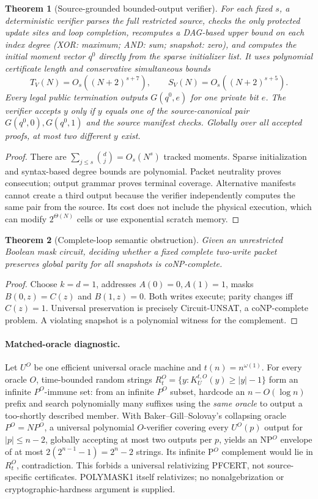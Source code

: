 \documentclass{article}
\newtheorem{theorem}{Theorem}
\begin{document}
\begin{theorem}[Source-grounded bounded-output verifier]
For each fixed $s$, a deterministic verifier parses the full restricted source, checks the only protected update sites and loop completion, recomputes a DAG-based upper bound on each index degree (XOR: maximum; AND: sum; snapshot: zero), and computes the initial moment vector $q^0$ directly from the sparse initializer list. It uses polynomial certificate length and conservative simultaneous bounds
\[
T_V(N)=O_s((N+2)^{s+7}),\qquad S_V(N)=O_s((N+2)^{s+5}).
\]
Every legal public termination outputs $G(q^0,e)$ for one private bit $e$. The verifier accepts $y$ only if $y$ equals one of the source-canonical pair $G(q^0,0),G(q^0,1)$ and the source manifest checks. Globally over \emph{all} accepted proofs, at most two different $y$ exist.
\end{theorem}
\begin{proof}
There are $\sum_{j\le s}\binom dj=O_s(N^s)$ tracked moments. Sparse initialization and syntax-based degree bounds are polynomial. Packet neutrality proves consecution; output grammar proves terminal coverage. Alternative manifests cannot create a third output because the verifier independently computes the same pair from the source. Its cost does not include the physical execution, which can modify $2^{\Theta(N)}$ cells or use exponential scratch memory.
\end{proof}

\begin{theorem}[Complete-loop semantic obstruction]
Given an unrestricted Boolean mask circuit, deciding whether a fixed complete two-write packet preserves global parity for all snapshots is coNP-complete.
\end{theorem}
\begin{proof}
Choose $k=d=1$, addresses $A(0)=0,A(1)=1$, masks $B(0,z)=C(z)$ and $B(1,z)=0$. Both writes execute; parity changes iff $C(z)=1$. Universal preservation is precisely Circuit-UNSAT, a coNP-complete problem. A violating snapshot is a polynomial witness for the complement.
\end{proof}

\paragraph{Matched-oracle diagnostic.}
Let $U^O$ be one efficient universal oracle machine and $t(n)=n^{\omega(1)}$. For every oracle $O$, time-bounded random strings $R_t^O=\{y:K_U^{t,O}(y)\ge |y|-1\}$ form an infinite $P^O$-immune set: from an infinite $P^O$ subset, hardcode an $n-O(\log n)$ prefix and search polynomially many suffixes using the \emph{same oracle} to output a too-shortly described member. With Baker--Gill--Solovay's collapsing oracle $P^O=NP^O$, a universal polynomial $O$-verifier covering every $U^O(p)$ output for $|p|\le n-2$, globally accepting at most two outputs per $p$, yields an NP$^O$ envelope of at most $2(2^{n-1}-1)=2^n-2$ strings. Its infinite P$^O$ complement would lie in $R_t^O$, contradiction. This forbids a universal relativizing PFCERT, not source-specific certificates. POLYMASK1 itself relativizes; no nonalgebrization or cryptographic-hardness argument is supplied.
\end{document}
